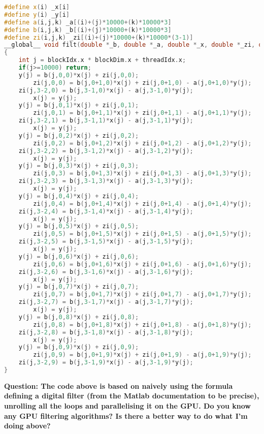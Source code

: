 \documentclass[a4paper]{article}
\newcommand{\question}[1]{\textbf{Question: #1}}
\begin{document}
\begin{lstlisting}[language=C++]
#define x(i) _x[i]
#define y(i) _y[i]
#define a(i,j,k) _a[(i)+(j)*10000+(k)*10000*3]
#define b(i,j,k) _b[(i)+(j)*10000+(k)*10000*3]
#define zi(i,j,k) _zi[(i)+(j)*10000+(k)*10000*(3-1)]
__global__ void filt(double *_b, double *_a, double *_x, double *_zi, double *_y)
{
    int j = blockIdx.x * blockDim.x + threadIdx.x;
    if(j>=10000) return;
    y(j) = b(j,0,0)*x(j) + zi(j,0,0);
        zi(j,0,0) = b(j,0+1,0)*x(j) + zi(j,0+1,0) - a(j,0+1,0)*y(j);
    zi(j,3-2,0) = b(j,3-1,0)*x(j) - a(j,3-1,0)*y(j);
        x(j) = y(j);
    y(j) = b(j,0,1)*x(j) + zi(j,0,1);
        zi(j,0,1) = b(j,0+1,1)*x(j) + zi(j,0+1,1) - a(j,0+1,1)*y(j);
    zi(j,3-2,1) = b(j,3-1,1)*x(j) - a(j,3-1,1)*y(j);
        x(j) = y(j);
    y(j) = b(j,0,2)*x(j) + zi(j,0,2);
        zi(j,0,2) = b(j,0+1,2)*x(j) + zi(j,0+1,2) - a(j,0+1,2)*y(j);
    zi(j,3-2,2) = b(j,3-1,2)*x(j) - a(j,3-1,2)*y(j);
        x(j) = y(j);
    y(j) = b(j,0,3)*x(j) + zi(j,0,3);
        zi(j,0,3) = b(j,0+1,3)*x(j) + zi(j,0+1,3) - a(j,0+1,3)*y(j);
    zi(j,3-2,3) = b(j,3-1,3)*x(j) - a(j,3-1,3)*y(j);
        x(j) = y(j);
    y(j) = b(j,0,4)*x(j) + zi(j,0,4);
        zi(j,0,4) = b(j,0+1,4)*x(j) + zi(j,0+1,4) - a(j,0+1,4)*y(j);
    zi(j,3-2,4) = b(j,3-1,4)*x(j) - a(j,3-1,4)*y(j);
        x(j) = y(j);
    y(j) = b(j,0,5)*x(j) + zi(j,0,5);
        zi(j,0,5) = b(j,0+1,5)*x(j) + zi(j,0+1,5) - a(j,0+1,5)*y(j);
    zi(j,3-2,5) = b(j,3-1,5)*x(j) - a(j,3-1,5)*y(j);
        x(j) = y(j);
    y(j) = b(j,0,6)*x(j) + zi(j,0,6);
        zi(j,0,6) = b(j,0+1,6)*x(j) + zi(j,0+1,6) - a(j,0+1,6)*y(j);
    zi(j,3-2,6) = b(j,3-1,6)*x(j) - a(j,3-1,6)*y(j);
        x(j) = y(j);
    y(j) = b(j,0,7)*x(j) + zi(j,0,7);
        zi(j,0,7) = b(j,0+1,7)*x(j) + zi(j,0+1,7) - a(j,0+1,7)*y(j);
    zi(j,3-2,7) = b(j,3-1,7)*x(j) - a(j,3-1,7)*y(j);
        x(j) = y(j);
    y(j) = b(j,0,8)*x(j) + zi(j,0,8);
        zi(j,0,8) = b(j,0+1,8)*x(j) + zi(j,0+1,8) - a(j,0+1,8)*y(j);
    zi(j,3-2,8) = b(j,3-1,8)*x(j) - a(j,3-1,8)*y(j);
        x(j) = y(j);
    y(j) = b(j,0,9)*x(j) + zi(j,0,9);
        zi(j,0,9) = b(j,0+1,9)*x(j) + zi(j,0+1,9) - a(j,0+1,9)*y(j);
    zi(j,3-2,9) = b(j,3-1,9)*x(j) - a(j,3-1,9)*y(j);
}
\end{lstlisting}

\question{The code above is based on naively using the formula defining a digital filter (from the Matlab documentation to be precise), unrolling all the loops and parallelising it on the GPU. Do you know any GPU filtering algorithms? Is there a better way to do what I'm doing above?}
\end{document}
